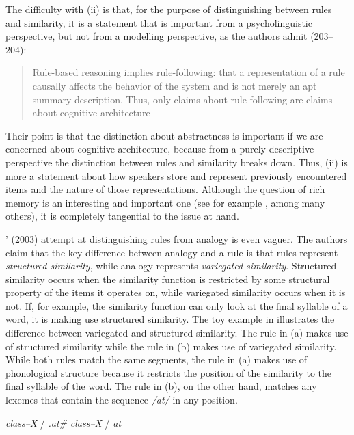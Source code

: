 The difficulty with (ii) is that, for the purpose of distinguishing between rules and similarity, it is a statement that is important from a psycholinguistic perspective, but not from a modelling perspective, as the authors admit (203--204):

\begin{quotation}
Rule-based reasoning implies rule-following: that a representation of a rule causally affects the behavior of the system and is not merely an apt summary description. Thus, only claims about rule-following are claims about cognitive architecture \autocite[203--204]{Hahn.1998}
\end{quotation}

Their point is that the distinction about abstractness is important if we are concerned about cognitive architecture, because from a purely descriptive perspective the distinction between rules and similarity breaks down. Thus, (ii) is more a statement about how speakers store and represent previously encountered items and the nature of those representations. Although the question of rich memory is an interesting and important one (see for example \cites{Bybee.2010, Kapatsinski.2014a, Port.2010a}, among many others), it is completely tangential to the issue at hand.

\citeauthor{Albright.2003}' (2003) attempt at distinguishing rules from analogy is even vaguer. The authors claim that the key difference between analogy and a rule is that rules represent \emph{structured similarity}, while analogy represents \emph{variegated similarity}. Structured similarity occurs when the similarity function is restricted by some structural property of the items it operates on, while variegated similarity occurs when it is not. If, for example, the similarity function can only look at the final syllable of a word, it is making use structured similarity. The toy example in  illustrates the difference between variegated and structured similarity. The rule in (a) makes use of structured similarity while the rule in (b) makes use of variegated similarity. While both rules match the same segments, the rule in (a) makes use of phonological structure because it restricts the position of the similarity to the final syllable of the word. The rule in (b), on the other hand, matches any lexemes that contain the sequence \textit{/at/} in any position.

\begin{exe}
    \ex \label{structured-simil}
    \begin{xlist}
        \ex \textit{class--X} / \textit{.at\#}
        \ex \textit{class--X} / \textit{at}
    \end{xlist}
\end{exe}

